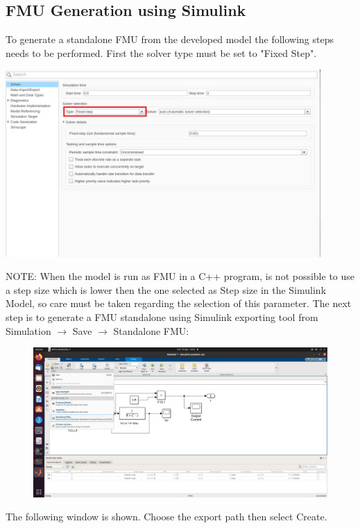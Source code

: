 \subsection{FMU Generation using Simulink}
To generate a standalone FMU from the developed model the following steps needs to be performed. 
First the solver type must be set to "Fixed Step". 
\begin{center}
\includegraphics[width=0.9\textwidth]{Solver.png}
\end{center}
NOTE: When the model is run as FMU in a C++ program, is not possible to use a step size which is lower then the one selected as Step size in the Simulink Model, so care must be taken regarding the selection of this parameter.
\newline
The next step is to generate a FMU standalone using Simulink exporting tool from Simulation $\rightarrow$ Save $\rightarrow$  Standalone FMU:
\begin{figure}[ht]
\centering
\includegraphics[width=1.0\textwidth]{FmuExport1.png}
\end{figure}
\newline
The following window is shown. Choose the export path then select Create.
\newline
